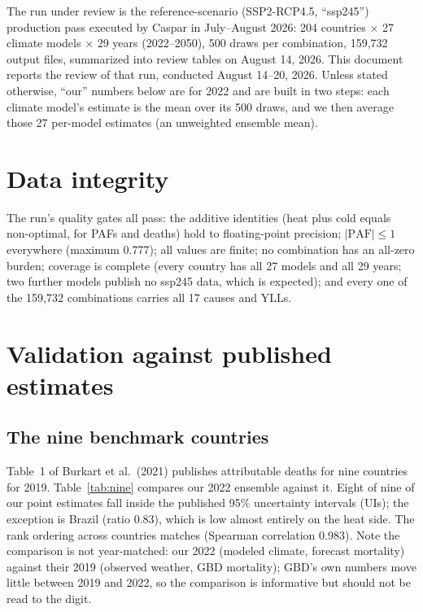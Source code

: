 \documentclass[11pt]{ozreport}
\begin{document}
The run under review is the reference-scenario (SSP2-RCP4.5, ``ssp245'')
production pass executed by Caspar in July--August 2026: 204 countries
$\times$ 27 climate models $\times$ 29 years (2022--2050), 500 draws per
combination, 159{,}732 output files, summarized into review tables on
August 14, 2026. This document reports the review of that run, conducted
August 14--20, 2026. Unless stated otherwise, ``our'' numbers below are for
2022 and are built in two steps: each climate model's estimate is the mean
over its 500 draws, and we then average those 27 per-model estimates (an
unweighted ensemble mean).

\section{Data integrity}

The run's quality gates all pass: the additive identities (heat plus cold
equals non-optimal, for PAFs and deaths) hold to floating-point precision;
$|\mathrm{PAF}| \le 1$ everywhere (maximum 0.777); all values are finite; no
combination has an all-zero burden; coverage is complete (every country has
all 27 models and all 29 years; two further models publish no ssp245 data,
which is expected); and every one of the 159{,}732 combinations carries all
17 causes and YLLs.

\section{Validation against published estimates}

\subsection{The nine benchmark countries}

Table~1 of Burkart et al.\ (2021) publishes attributable deaths for nine
countries for 2019. Table~\ref{tab:nine} compares our 2022 ensemble against
it. Eight of nine of our point estimates fall inside the published 95\%
uncertainty intervals (UIs); the exception is Brazil (ratio 0.83), which is
low almost entirely on the heat side. The rank ordering across countries
matches (Spearman correlation 0.983). Note the comparison is not
year-matched: our 2022 (modeled climate, forecast mortality) against their
2019 (observed weather, GBD mortality); GBD's own numbers move little between
2019 and 2022, so the comparison is informative but should not be read to the
digit.
\end{document}
